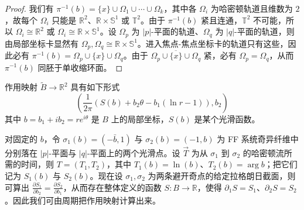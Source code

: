 \begin{proof}
我们有 $\pi^{-1} (b)=\{x\}\cup\Omega_1\cup\dotsb\cup\Omega_k$，其中各 $\Omega_i$ 为哈密顿轨道且维数为 $2$，故每个 $\Omega_i$ 只能是 $\mathbb{R}^2$、$\mathbb{R}\times\mathbb{S}^1$ 或 $\mathbb{T}^2$。由于 $\pi^{-1} (b)$ 紧且连通，$\mathbb{T}^2$ 不可能，所以 $\Omega_i\cong\mathbb{R}^2$ 或 $\Omega_i\cong\mathbb{R}\times\mathbb{S}^1$。设 $\Omega_p$ 为 $\vert p\vert$-平面的轨道、$\Omega_q$ 为 $\vert q\vert$-平面的轨道，则由局部坐标卡显然有 $\Omega_p,\Omega_q\cong\mathbb{R}\times\mathbb{S}^1$。进入焦点-焦点坐标卡的轨道只有这些，因此必有 $\pi^{-1} (b)=\Omega_p\cup\{x\}\cup\Omega_q$。由于 $\overline{\Omega_p\cup\{x\}\cup\Omega_q}$ 紧，必有 $\Omega_p=\Omega_q$，从而 $\pi^{-1} (b)$ 同胚于单收缩环面。
\end{proof}


\begin{theorem*}
作用映射 $\tilde{B}\to\mathbb{R}^2$ 具有如下形式
\[
\left(\frac{1}{2\pi}(S(b)+b_2\theta -b_1 (\ln r-1)),b_2\right)
\]
其中 $b=b_1+ib_2=re^{i\theta}$ 是 $B$ 上的局部坐标，$S(b)$ 是某个光滑函数。
\end{theorem*}


对固定的 $b$，令 $\sigma_1(b)=(-\bar{b},1)$ 与 $\sigma_2 (b)=(-1,b)$ 为 FF 系统奇异纤维中分别落在 $\vert p\vert$-平面与 $\vert q\vert$-平面上的两个光滑点。设 $\vec{T}$ 为从 $\sigma_1$ 到 $\sigma_2$ 的哈密顿流所需的时间，则 $T=(T_1,T_2)$，其中 $T_1(b)=\ln (b)$、$T_2 (b)=\arg b$；把它们记为 $S_1 (b)$ 与 $S_2 (b)$。现在设 $\sigma_1, \sigma_2$ 为两条避开奇点的给定拉格朗日截面，则可算出 $\displaystyle\frac{\partial S_1}{\partial b_2}=\frac{\partial S_2}{\partial b_1}$，从而存在整体定义的函数 $S\colon B\to\mathbb{R}$，使得 $\partial_1 S=S_1$、$\partial_2 S=S_2$。因此我们可由周期把作用映射计算出来。


